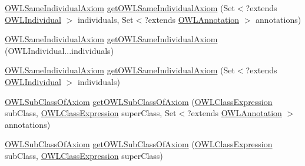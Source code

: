 \begin{DoxyCompactItemize}
\item 
\hyperlink{interfaceorg_1_1semanticweb_1_1owlapi_1_1model_1_1_o_w_l_same_individual_axiom}{O\-W\-L\-Same\-Individual\-Axiom} \hyperlink{classuk_1_1ac_1_1manchester_1_1cs_1_1owl_1_1owlapi_1_1_o_w_l_data_factory_impl_afff1337291d015881801d0a0b9af7edd}{get\-O\-W\-L\-Same\-Individual\-Axiom} (Set$<$?extends \hyperlink{interfaceorg_1_1semanticweb_1_1owlapi_1_1model_1_1_o_w_l_individual}{O\-W\-L\-Individual} $>$ individuals, Set$<$?extends \hyperlink{interfaceorg_1_1semanticweb_1_1owlapi_1_1model_1_1_o_w_l_annotation}{O\-W\-L\-Annotation} $>$ annotations)
\item 
\hyperlink{interfaceorg_1_1semanticweb_1_1owlapi_1_1model_1_1_o_w_l_same_individual_axiom}{O\-W\-L\-Same\-Individual\-Axiom} \hyperlink{classuk_1_1ac_1_1manchester_1_1cs_1_1owl_1_1owlapi_1_1_o_w_l_data_factory_impl_ad236812dd72a75ee2845070fc55cabbb}{get\-O\-W\-L\-Same\-Individual\-Axiom} (O\-W\-L\-Individual...\-individuals)
\item 
\hyperlink{interfaceorg_1_1semanticweb_1_1owlapi_1_1model_1_1_o_w_l_same_individual_axiom}{O\-W\-L\-Same\-Individual\-Axiom} \hyperlink{classuk_1_1ac_1_1manchester_1_1cs_1_1owl_1_1owlapi_1_1_o_w_l_data_factory_impl_a9248d63fd11ef434ecd9d88bad78b2c9}{get\-O\-W\-L\-Same\-Individual\-Axiom} (Set$<$?extends \hyperlink{interfaceorg_1_1semanticweb_1_1owlapi_1_1model_1_1_o_w_l_individual}{O\-W\-L\-Individual} $>$ individuals)
\item 
\hyperlink{interfaceorg_1_1semanticweb_1_1owlapi_1_1model_1_1_o_w_l_sub_class_of_axiom}{O\-W\-L\-Sub\-Class\-Of\-Axiom} \hyperlink{classuk_1_1ac_1_1manchester_1_1cs_1_1owl_1_1owlapi_1_1_o_w_l_data_factory_impl_a708564ef642435f6b34f00b6a6607874}{get\-O\-W\-L\-Sub\-Class\-Of\-Axiom} (\hyperlink{interfaceorg_1_1semanticweb_1_1owlapi_1_1model_1_1_o_w_l_class_expression}{O\-W\-L\-Class\-Expression} sub\-Class, \hyperlink{interfaceorg_1_1semanticweb_1_1owlapi_1_1model_1_1_o_w_l_class_expression}{O\-W\-L\-Class\-Expression} super\-Class, Set$<$?extends \hyperlink{interfaceorg_1_1semanticweb_1_1owlapi_1_1model_1_1_o_w_l_annotation}{O\-W\-L\-Annotation} $>$ annotations)
\item 
\hyperlink{interfaceorg_1_1semanticweb_1_1owlapi_1_1model_1_1_o_w_l_sub_class_of_axiom}{O\-W\-L\-Sub\-Class\-Of\-Axiom} \hyperlink{classuk_1_1ac_1_1manchester_1_1cs_1_1owl_1_1owlapi_1_1_o_w_l_data_factory_impl_a0b0705bc7a80b6556572ac9033bf268f}{get\-O\-W\-L\-Sub\-Class\-Of\-Axiom} (\hyperlink{interfaceorg_1_1semanticweb_1_1owlapi_1_1model_1_1_o_w_l_class_expression}{O\-W\-L\-Class\-Expression} sub\-Class, \hyperlink{interfaceorg_1_1semanticweb_1_1owlapi_1_1model_1_1_o_w_l_class_expression}{O\-W\-L\-Class\-Expression} super\-Class)

\end{DoxyCompactItemize}
